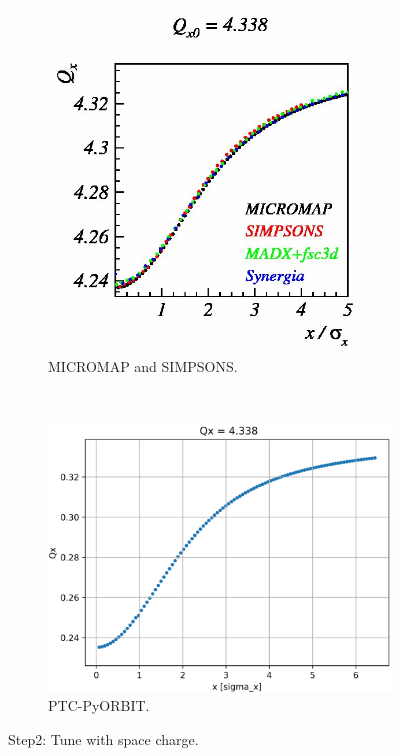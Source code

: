 \documentclass[a4paper]{cernatsnote}
\begin{document}
\begin{figure}
        \centering
        \begin{subfigure}{.5\textwidth}
          \centering
          \includegraphics[width=\textwidth]{Step2_tune_x.png}
          \caption{MICROMAP and SIMPSONS.}
          \label{fig:step2_m}
        \end{subfigure}~~~~~~
        \begin{subfigure}{.5\textwidth}
          \centering
          \includegraphics[width=\textwidth]{Step2_tune_x_PO.png}
          \caption{PTC-PyORBIT.}
          \label{fig:step2_po}
        \end{subfigure}
        \caption{Step2: Tune with space charge.}
        \label{fig:step2}
\end{figure}
\end{document}
